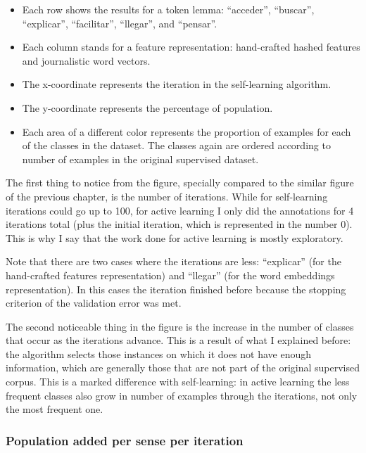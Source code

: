 \begin{itemize}
  \item Each row shows the results for a token lemma: ``acceder'', ``buscar'',
    ``explicar'', ``facilitar'', ``llegar'', and ``pensar''.
  \item Each column stands for a feature representation: hand-crafted hashed
    features and journalistic word vectors.
  \item The x-coordinate represents the iteration in the self-learning
    algorithm.
  \item The y-coordinate represents the percentage of population.
  \item Each area of a different color represents the proportion of examples
    for each of the classes in the dataset. The classes again are ordered
    according to number of examples in the original supervised dataset.
\end{itemize}

The first thing to notice from the figure, specially compared to the similar
figure of the previous chapter, is the number of iterations. While for
self-learning iterations could go up to 100, for active learning I only did the
annotations for 4 iterations total (plus the initial iteration, which is
represented in the number 0). This is why I say that the work done for active
learning is mostly exploratory.

Note that there are two cases where the iterations are less: ``explicar'' (for
the hand-crafted features representation) and ``llegar'' (for the word
embeddings representation). In this cases the iteration finished before because
the stopping criterion of the validation error was met.

The second noticeable thing in the figure is the increase in the number of
classes that occur as the iterations advance. This is a result of what I
explained before: the algorithm selects those instances on which it does not
have enough information, which are generally those that are not part of the
original supervised corpus. This is a marked difference with self-learning: in
active learning the less frequent classes also grow in number of examples
through the iterations, not only the most frequent one.

\subsubsection{Population added per sense per iteration}

